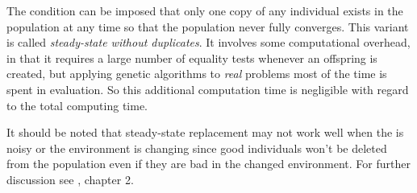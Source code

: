 The condition can be imposed that only one copy of any individual
exists in the population at any time so that the population never
fully converges.  This variant is called \emph{steady-state without
duplicates}.  It involves some computational overhead, in that it
requires a large number of equality tests whenever an offspring is
created, but applying genetic algorithms to \emph{real} problems most
of the time is spent in evaluation.  So this additional computation
time is negligible with regard to the total computing time.

It should be noted that steady-state replacement may not work well
when the  is noisy or the environment is changing
since good individuals won't be deleted from the population even if
they are bad in the changed environment.  For further discussion see
\cite{Davis:91}, chapter 2.
